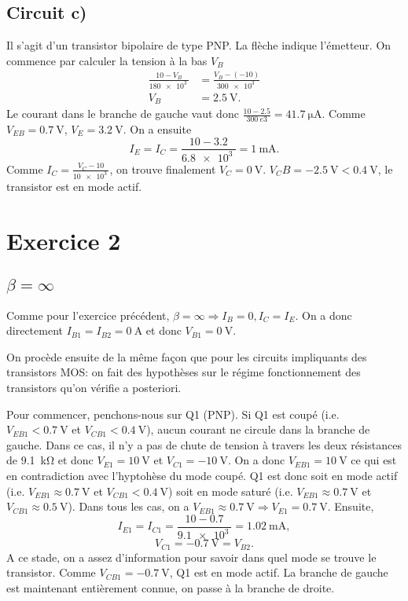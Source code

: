 \documentclass[frenchb,DIV=13]{scrartcl}
\begin{document}
\subsection*{Circuit c)}
Il s'agit d'un transistor bipolaire de type PNP. La flèche indique l'émetteur. On commence
par calculer la tension à la bas $V_B$
\begin{align*}
	\frac{10-V_B}{\SI{180e3}{}} &= \frac{V_B-(-10)}{\SI{300e3}{}} \\
	V_B & = \SI{2.5}{\volt}.
\end{align*}
Le courant dans le branche de gauche vaut donc $\frac{10-2.5}{\SI{300}{e3}} = \SI{41.7}{\micro\ampere}$.
Comme $V_{EB} = \SI{0.7}{\volt}$, $V_E = \SI{3.2}{\volt}$.
On a ensuite
\[ I_E = I_C = \frac{10-3.2}{\SI{6.8e3}{}} = \SI{1}{\milli\ampere}.\]
Comme $I_C = \frac{V_C-10}{\SI{10e3}{}}$, on trouve finalement $V_C = \SI{0}{\volt}$.
$V_CB = -\SI{2.5}{\volt < \SI{0.4}{\volt}}$, le transistor est en mode actif.

\section*{Exercice 2}
\subsection*{$\beta = \infty$}
Comme pour l'exercice précédent, $\beta = \infty \Rightarrow I_B = 0, I_C = I_E$.
On a donc directement $I_{B1} = I_{B2} = \SI{0}{\ampere}$ et donc $V_{B1} = \SI{0}{\volt}$.

On procède ensuite de la même façon que pour les circuits impliquants des transistors MOS: on
fait des hypothèses sur le régime fonctionnement des transistors qu'on vérifie a posteriori.

Pour commencer, penchons-nous sur Q1 (PNP). Si Q1 est coupé (i.e. $V_{EB1} < \SI{0.7}{\volt}$
et $V_{CB1} < \SI{0.4}{\volt}$), aucun courant ne circule dans la branche de gauche. Dans ce cas,
il n'y a pas de chute de tension à travers les deux résistances de \SI{9.1}{\kilo\ohm} et donc
$V_{E1} = \SI{10}{\volt}$ et $V_{C1} = -\SI{10}{\volt}$. On a donc $V_{EB1} = \SI{10}{\volt}$
ce qui est en contradiction avec l'hyptohèse du mode coupé. Q1 est donc soit en mode actif
(i.e. $V_{EB1} \approx \SI{0.7}{\volt}$ et $V_{CB1} < \SI{0.4}{\volt}$) soit en mode saturé
(i.e. $V_{EB1} \approx \SI{0.7}{\volt}$ et $V_{CB1} \approx \SI{0.5}{\volt}$). Dans tous les cas,
on a $V_{EB1} \approx \SI{0.7}{\volt} \Rightarrow V_{E1} = \SI{0.7}{\volt}$. Ensuite,
\[ I_{E1} = I_{C1} = \frac{10-0.7}{\SI{9.1e3}{}} = \SI{1.02}{\milli\ampere}, \]
\[ V_{C1} = \SI{-0.7}{\volt} = V_{B2}. \]
A ce stade, on a assez d'information pour savoir dans quel mode se trouve le transistor. Comme
$V_{CB1} = \SI{-0.7}{\volt}$, Q1 est en mode actif. La branche de gauche est maintenant entièrement
connue, on passe à la branche de droite.
\end{document}
